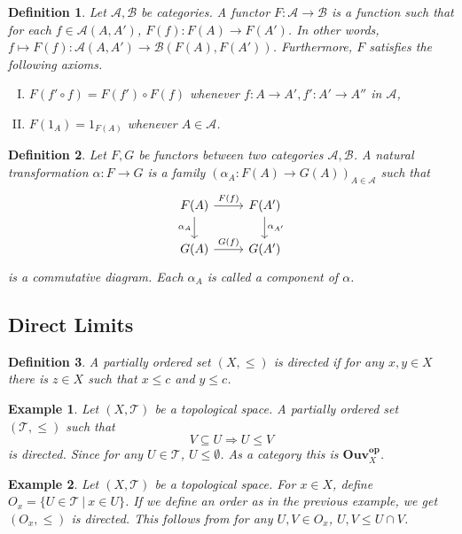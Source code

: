 \documentclass{article}
\newtheorem{definition}{Definition}[section]
\newtheorem{example}{Example}[section]
\numberwithin{equation}{section}
\begin{document}
\begin{definition}
Let $\mathcal{A},\mathcal{B}$ be categories. A functor $F:\mathcal{A}\to\mathcal{B}$ is a function such that for each $f\in\mathcal{A}(A,A')$, $F(f):F(A)\to F(A')$. In other words, $f\mapsto F(f):\mathcal{A}(A,A')\to\mathcal{B}(F(A),F(A'))$. Furthermore, $F$ satisfies the following axioms.
\begin{enumerate}[I).]
\item $F(f'\circ f) = F(f')\circ F(f)$ whenever $f:A\to A',f':A'\to A''$ in $\mathcal{A}$,
\item $F(1_A) = 1_{F(A)}$ whenever $A\in\mathcal{A}$. 
\end{enumerate}
\end{definition}

\begin{definition}
Let $F,G$ be functors between two categories $\mathcal{A},\mathcal{B}$. A natural transformation $\alpha:F\to G$ is a family $(\alpha_A:F(A)\to G(A))_{A\in\mathcal{A}}$ such that 
\[ \begin{tikzcd}
F(A) \arrow{r}{F(f)} \arrow[swap]{d}{\alpha_A} & F(A') \arrow{d}{\alpha_{A'}} \\%
G(A) \arrow{r}{G(f)}& G(A')
\end{tikzcd}
\]
is a commutative diagram. Each $\alpha_A$ is called a component of $\alpha$. 
 \label{natural_transformation}
\end{definition}

\subsection{Direct Limits}

\begin{definition}
A partially ordered set $(X,\leq)$ is directed if for any $x,y\in X$ there is $z\in X$ such that $x\leq c$ and $y\leq c$.
\end{definition}

\begin{example}
Let $(X,\mathcal{T})$ be a topological space. A partially ordered set $(\mathcal{T},\leq)$ such that 
\begin{equation*}
V\subseteq U\Rightarrow U\leq V
\end{equation*}
is directed. Since for any $U\in\mathcal{T}$, $U\leq \emptyset$. As a category this is $\mathbf{Ouv}_X^{\mathbf{op}}$.
\end{example}

\begin{example}
\label{top_dir_cat}
Let $(X,\mathcal{T})$ be a topological space. For $x\in X$, define $O_x = \{U\in\mathcal{T}\:|\: x\in U\}$. If we define an order as in the previous example, we get $(O_x,\leq)$ is directed. This follows from for any $U,V\in O_x$, $U,V\leq U\cap V$.  
\end{example}
\end{document}
